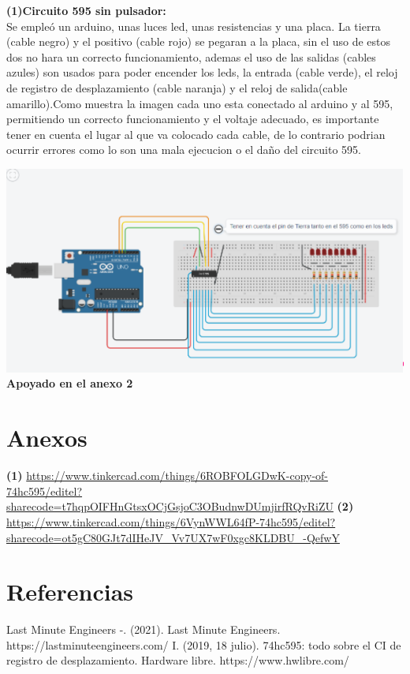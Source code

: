 \documentclass{article}
\begin{document}
\begin{justify}


\textbf{(1)Circuito 595 sin pulsador:}\\
Se empleó un arduino, unas luces led, unas resistencias y una placa. La tierra (cable negro) y el positivo (cable rojo) se pegaran a la placa, sin el uso de estos dos no hara un correcto funcionamiento, ademas el uso de las salidas (cables azules) son usados para poder encender los leds, la entrada (cable verde), el reloj de registro de desplazamiento (cable naranja) y el reloj de salida(cable amarillo).Como muestra la imagen cada uno esta conectado al arduino y al 595, permitiendo un correcto funcionamiento y el voltaje adecuado, es importante tener en cuenta el lugar al que va colocado cada cable, de lo contrario podrian ocurrir errores como lo son una mala ejecucion o el daño del circuito 595.
\end{justify}
\newline
\newline
\newline
\includegraphics[scale=0.5]{figura3.png}
\centering
\textbf{Apoyado en el anexo 2}
\newline
\newline
\newline

\newpage
\section{Anexos}
\label{Anexos}
\textbf{(1)}
\url{https://www.tinkercad.com/things/6ROBFOLGDwK-copy-of-74hc595/editel?sharecode=t7hqpOIFHnGtsxOCjGsjoC3OBudnwDUmjirfRQvRiZU}
\newline
\newline
\textbf{(2)}
\url{https://www.tinkercad.com/things/6VynWWL64fP-74hc595/editel?sharecode=ot5gC80GJt7dIHeJV_Vv7UX7wF0xgc8KLDBU_-QefwY}

\newpage
\section{Referencias}
\label{Referencias}

\justify
Last Minute Engineers -. (2021). Last Minute Engineers. https://lastminuteengineers.com/
\newline
I. (2019, 18 julio). 74hc595: todo sobre el CI de registro de desplazamiento. Hardware libre. https://www.hwlibre.com/
\end{document}
